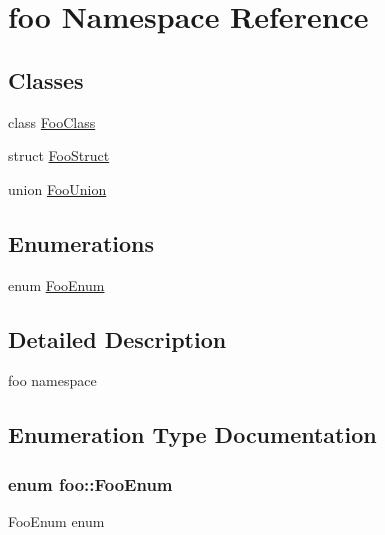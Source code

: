 \hypertarget{namespacefoo}{}\section{foo Namespace Reference}
\label{namespacefoo}
\subsection*{Classes}
\begin{DoxyCompactItemize}
\item 
class \hyperlink{classfoo_1_1FooClass}{Foo\+Class}
\item 
struct \hyperlink{structfoo_1_1FooStruct}{Foo\+Struct}
\item 
union \hyperlink{unionfoo_1_1FooUnion}{Foo\+Union}
\end{DoxyCompactItemize}
\subsection*{Enumerations}
\begin{DoxyCompactItemize}
\item 
enum \hyperlink{namespacefoo_a8a2f7a720c8db0ef40ca9908512645a6}{Foo\+Enum} 
\end{DoxyCompactItemize}


\subsection{Detailed Description}
foo namespace 

\subsection{Enumeration Type Documentation}
\subsubsection[{\texorpdfstring{Foo\+Enum}{FooEnum}}]{\setlength{\rightskip}{0pt plus 5cm}enum {\bf foo\+::\+Foo\+Enum}}\hypertarget{namespacefoo_a8a2f7a720c8db0ef40ca9908512645a6}{}\label{namespacefoo_a8a2f7a720c8db0ef40ca9908512645a6}
Foo\+Enum enum 